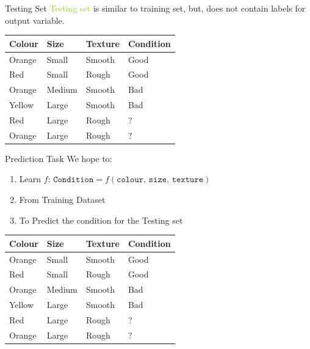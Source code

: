 \documentclass[usenames,dvipsnames]{beamer}
\begin{document}
\begin{frame}{Testing Set}
\textcolor{YellowGreen}{Testing set} is similar to \textcolor{Peach}{training set}, but, does not contain labels for output variable. 

\begin{table}[]
	\begin{tabular}{|l|l|l||l|}
		\hline 
		\textbf{Colour} & \textbf{Size} & \textbf{Texture} & \textbf{Condition} \\ \hline 
		\rowcolor{Peach}
		Orange & Small & Smooth  & Good      \\
		\rowcolor{Peach}
		Red    & Small  & Rough  & Good \\
		\rowcolor{Peach}
		Orange & Medium & Smooth & Bad \\
		\rowcolor{Peach}
		Yellow & Large  & Smooth & Bad \\ \hline
				\rowcolor{YellowGreen}
		Red    & Large  & Rough  & ? \\
		\rowcolor{YellowGreen}
		Orange &  Large & Rough  & ? \\ \hline          
	\end{tabular}
\end{table}
\end{frame}

\begin{frame}{Prediction Task}
We hope to:
\begin{enumerate}
	\item Learn $f$: 		$\texttt{Condition} = f(\texttt{colour, size, texture})$
	\item From Training Dataset
	\item To Predict the condition for the Testing set
\end{enumerate}


\begin{table}[]
	\begin{tabular}{|l|l|l||l|}
		\hline 
		
		\textbf{Colour} & \textbf{Size} & \textbf{Texture} & \textbf{Condition} \\ \hline 
		Orange & Small & Smooth  & Good      \\
		Red    & Small  & Rough  & Good \\
		Orange & Medium & Smooth & Bad \\
		Yellow & Large  & Smooth & Bad \\ \hline
		Red    & Large  & Rough  & ? \\
		Orange &  Large & Rough  & ? \\ \hline          
	\end{tabular}
\end{table}
\end{frame}
\end{document}
